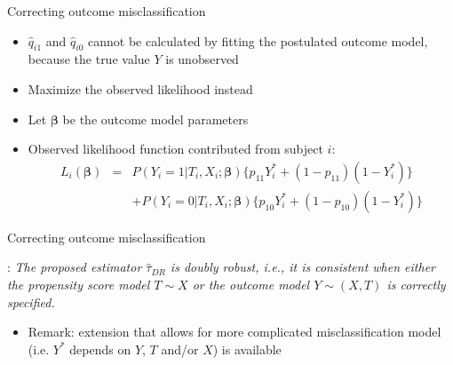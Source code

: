 \documentclass[12pt,aspectratio=169]{beamer}
\begin{document}
\begin{frame}{Correcting outcome misclassification}

\begin{itemize}
\item  $\hat q_{i1}$ and $\hat q_{i0}$ cannot be calculated by  fitting the postulated outcome model,  because the true value $Y$ is unobserved

\item Maximize the observed likelihood instead



\pause


\bigskip

\item Let $\boldsymbol\beta$ be the  outcome model parameters

 \item {\color{cred}Observed likelihood} function contributed from subject $i$:
\begin{eqnarray*}
 L_i(\boldsymbol\beta)&=&P(Y_i=1|T_i, X_i; \boldsymbol\beta)\{p_{11}Y_i^\ast+(1-p_{11})(1-Y_i^\ast)\}\\
 &&+P(Y_i=0|T_i, X_i; \boldsymbol\beta)\{p_{10}Y_i^\ast+(1-p_{10})(1-Y_i^\ast)\}
\end{eqnarray*}

\end{itemize}


\end{frame}






\begin{frame}{Correcting outcome misclassification}


\begin{block}
:
{\it
The proposed estimator $\hat\tau_{DR}$ is {\color{cred}doubly robust}, i.e., it is  {\color{cred}consistent}  when either the propensity score model $T\sim X$ or the outcome model $Y\sim (X, T)$ is correctly specified.
}
\end{block}

\bigskip

\begin{itemize}

\item Remark: extension that allows for more complicated misclassification model (i.e. $Y^\ast$ depends on $Y$, $T$ and/or $X$) is available


\end{itemize}

\end{frame}
\end{document}
